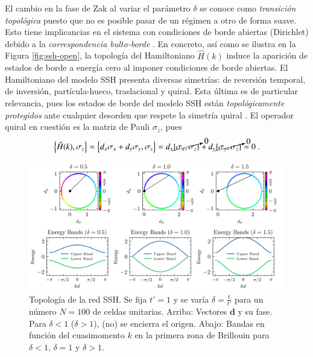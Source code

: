 El cambio en la fase de Zak al variar el parámetro $\delta$  se conoce como \textit{transición topológica} puesto que no es posible pasar de un régimen a otro de forma suave. Esto tiene implicancias en el sistema con condiciones de borde abiertas (Dirichlet) debido a la \textit{correspondencia bulto-borde} \cite{topobulk}. En concreto, así como se ilustra en la Figura \ref{fig:ssh-open}, la topología del Hamiltoniano $\hat{H}(k)$ induce la aparición de estados de borde a energía cero al imponer condiciones de borde abiertas.
El Hamiltoniano del modelo SSH presenta diversas simetrías: de reversión temporal, de inversión, partícula-hueco, traslacional y quiral. Esta última es de particular relevancia, pues los estados de borde del modelo SSH están \textit{topológicamente protegidos} ante cualquier desorden que respete la simetría quiral \cite{ssh-course}. El operador quiral en cuestión es la matriz de Pauli $\sigma_z$, pues 
\begin{align*}
	\left\{\hat{H}(k), \sigma_z \right\} = \left\{d_x \sigma_x + d_y\sigma_y , \sigma_z \right\} = d_x \cancelto{0}{\left\{\sigma_x, \sigma_z \right\}} + d_y \cancelto{0}{\{\sigma_y, \sigma_z\}} = 0 \ .
\end{align*}
\begin{figure}[h]
	\centering
	\includegraphics[width=\linewidth]{media/ssh-winding}
	\caption[Topología de la red SSH.]{Topología de la red SSH. Se fija $t'=1$ y se varía $\delta=\frac{t}{t'}$ para un número $N=100$ de celdas unitarias. Arriba: Vectores $\textbf{d}$ y su fase. Para $\delta < 1$ ($\delta > 1$), (no) se encierra el origen. Abajo: Bandas en función del cuasimomento $k$ en la primera zona de Brillouin para $\delta < 1$, $\delta = 1$ y $\delta > 1$. 
	\label{fig:ssh-topo}}
\end{figure} 
